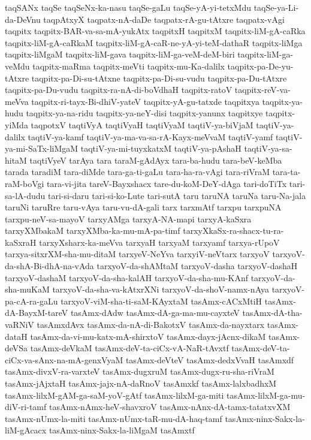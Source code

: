 {taqSANx
taqSe
taqSeNx-ka-nasu
taqSe-gaLu
taqSe-yA-yi-tetxMdu
taqSe-ya-Li-da-DeVnu
taqpAtxyX
taqpatx-nA-daDe
taqpatx-rA-gu-tAtxre
taqpatx-vAgi
taqpitx
taqpitx-BAR-va-sa-mA-yukAtx
taqpitxH
taqpitxM
taqpitx-liM-gA-caRka
taqpitx-liM-gA-caRkaM
taqpitx-liM-gA-caR-ne-yA-yi-teM-dathaR
taqpitx-liMga
taqpitx-liMgaM
taqpitx-liM-gava
taqpitx-liM-ga-veM-deM-biri
taqpitx-liM-ga-veMdu
taqpitx-maRma
taqpitx-meVti
taqpitx-mu-Ka-dalilx
taqpitx-pa-De-yu-tAtxre
taqpitx-pa-Di-su-tAtxne
taqpitx-pa-Di-su-vudu
taqpitx-pa-Du-tAtxre
taqpitx-pa-Du-vudu
taqpitx-ra-nA-di-boVdhaH
taqpitx-ratoV
taqpitx-reV-va-meVva
taqpitx-ri-tayx-Bi-dhiV-yateV
taqpitx-yA-gu-tatxde
taqpitxya
taqpitx-ya-hudu
taqpitx-ya-na-ridu
taqpitx-ya-neY-disi
taqpitx-yanunx
taqpitxye
taqpitx-yiMda
taqpotxV
taqtiVyA
taqtiVyaH
taqtiVyaM
taqtiV-ya-biVjaM
taqtiV-ya-dalilx
taqtiV-ya-kamf
taqtiV-ya-ma-va-sa-rA-Kayx-meVvaM
taqtiV-yamf
taqtiV-ya-mi-SaTx-liMgaM
taqtiV-ya-mi-tuyxkatxM
taqtiV-ya-pAshaH
taqtiV-ya-sa-hitaM
taqtiVyeV
tarAya
tara
taraM-gAdAyx
tara-ba-hudu
tara-beV-keMba
tarada
taradiM
tara-diMde
tara-ga-ti-gaLu
tara-ha-ra-vAgi
tara-riVraM
tara-ta-raM-boVgi
tara-vi-jita
tareV-Bayxshacx
tare-du-koM-DeY-dAga
tari-doTiTx
tari-sa-lA-dudu
tari-si-daru
tari-si-ko-Lute
tari-sutA
taru
taruNA
taruNa
taru-Na-jala
taruNi
taruRre
taru-vAya
taru-vu-dA-gali
tarx
tarxmAtf
tarxpu
tarxpuNA
tarxpu-neV-sa-mayoV
tarxyAMga
tarxyA-NA-mapi
tarxyA-kaSxra
tarxyXMbakaM
tarxyXMba-ka-mu-mA-pa-timf
tarxyXkaSx-ra-shacx-tu-ra-kaSxraH
tarxyXsharx-ka-meVva
tarxyaH
tarxyaM
tarxyamf
tarxya-rUpoV
tarxya-sitxrXM-sha-mu-ditaM
tarxyeV-NeYva
tarxyiV-neVtarx
tarxyoV
tarxyoV-da-shA-Bi-dhA-na-vAda
tarxyoV-da-shAMtaM
tarxyoV-dasha
tarxyoV-dashaH
tarxyoV-dashaM
tarxyoV-da-sha-kalAH
tarxyoV-da-sha-mu-KAnf
tarxyoV-da-sha-muKaM
tarxyoV-da-sha-va-kAtxrXNi
tarxyoV-da-shoV-namx-nAya
tarxyoV-pa-cA-ra-gaLu
tarxyoV-viM-sha-ti-saM-KAyxtaM
tasAmx-cACxMtiH
tasAmx-dA-BayxM-tareV
tasAmx-dAdw
tasAmx-dA-ga-ma-mu-cayxteV
tasAmx-dA-tha-vaRNiV
tasAmxdAvx
tasAmx-da-nA-di-BakotxV
tasAmx-da-nayxtarx
tasAmx-dataH
tasAmx-da-vi-mu-katx-mA-shirxtoV
tasAmx-dayx-jAcnx-dikaM
tasAmx-deVSa
tasAmx-deVkaM
tasAmx-deV-ta-ciCx-vA-NaR-tAvxtf
tasAmx-deV-ta-ciCx-va-sAnx-na-mA-genxVyaM
tasAmx-deVteV
tasAmx-dedxVvaH
tasAmxdf
tasAmx-divxV-ra-varxteV
tasAmx-dugxruM
tasAmx-dugx-ru-sha-riVraM
tasAmx-jAjxtaH
tasAmx-jajx-nA-daRnoV
tasAmxkf
tasAmx-lalxbadhxM
tasAmx-lilxM-gAM-ga-saM-yoV-gAtf
tasAmx-lilxM-ga-miti
tasAmx-lilxM-ga-mu-diV-ri-tamf
tasAmx-nAmx-heV-shavxroV
tasAmx-nAnx-dA-tamx-tatatxvXM
tasAmx-nUmx-la-miti
tasAmx-nUmx-taR-mu-dA-haq-tamf
tasAmx-ninx-Sakx-la-liM-gAcacx
tasAmx-ninx-Sakx-la-liMgaM
tasAmxtf
}
